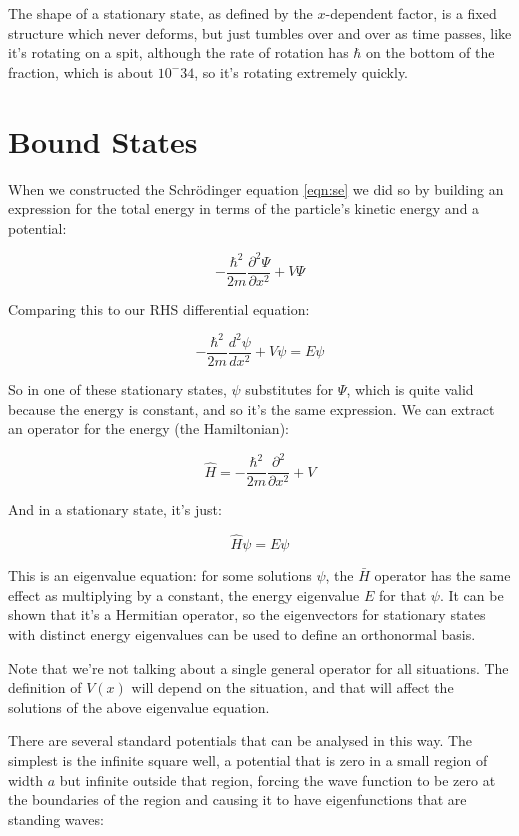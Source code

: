 The shape of a stationary state, as defined by the $x$-dependent factor, is a fixed structure which never deforms, but just tumbles over and over as time passes, like it's rotating on a spit, although the rate of rotation has $\hbar$ on the bottom of the fraction, which is about $10^-34$, so it's rotating extremely quickly.

\section{Bound States}

When we constructed the Schrödinger equation \eqref{eqn:se} we did so by building an expression for the total energy in terms of the particle's kinetic energy and a potential:

$$
- \frac{\hbar^2}{2m} \frac{\partial^2 \Psi}{\partial x^2} + V{\Psi}
$$  

Comparing this to our RHS differential equation:

$$
- \frac{\hbar^2}{2m}
\frac{d^2 \psi}{d x^2}
+ V\psi
=
E\psi
$$

So in one of these stationary states, $\psi$ substitutes for $\Psi$, which is quite valid because the energy is constant, and so it's the same expression. We can extract an operator for the energy (the Hamiltonian):

$$
\hat{H} = 
- \frac{\hbar^2}{2m} \frac{\partial^2}{\partial x^2} + V
$$

And in a stationary state, it's just:

$$
\hat{H}\psi
=
E\psi
$$

This is an eigenvalue equation: for some solutions $\psi$, the $\bar{H}$ operator has the same effect as multiplying by a constant, the energy eigenvalue $E$ for that $\psi$. It can be shown that it's a Hermitian operator, so the eigenvectors for stationary states with distinct energy eigenvalues can be used to define an orthonormal basis.

Note that we're not talking about a single general operator for all situations. The definition of $V(x)$ will depend on the situation, and that will affect the solutions of the above eigenvalue equation.

There are several standard potentials that can be analysed in this way. The simplest is the infinite square well, a potential that is zero in a small region of width $a$ but infinite outside that region, forcing the wave function to be zero at the boundaries of the region and causing it to have eigenfunctions that are standing waves:


